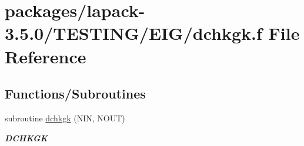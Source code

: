 \hypertarget{dchkgk_8f}{}\section{packages/lapack-\/3.5.0/\+T\+E\+S\+T\+I\+N\+G/\+E\+I\+G/dchkgk.f File Reference}
\label{dchkgk_8f}
\subsection*{Functions/\+Subroutines}
\begin{DoxyCompactItemize}
\item 
subroutine \hyperlink{group__double__eig_ga4c4c10b0d7b63d96afa90ce5928d6d30}{dchkgk} (N\+I\+N, N\+O\+U\+T)
\begin{DoxyCompactList}\small\item\em {\bfseries D\+C\+H\+K\+G\+K} \end{DoxyCompactList}\end{DoxyCompactItemize}
